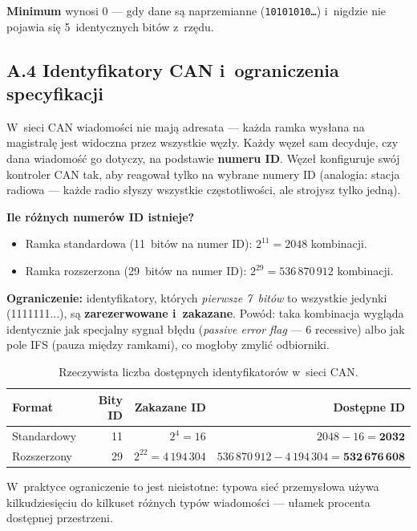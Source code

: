 \documentclass[12pt,a4paper]{article}
\begin{document}
\textbf{Minimum} wynosi 0 — gdy dane są naprzemianne (\texttt{10101010\ldots})
i~nigdzie nie pojawia się 5~identycznych bitów z~rzędu.

\subsection*{A.4 Identyfikatory CAN i~ograniczenia specyfikacji}

W~sieci CAN wiadomości nie mają adresata — każda ramka wysłana na magistralę
jest widoczna przez wszystkie węzły. Każdy węzeł sam decyduje, czy dana
wiadomość go dotyczy, na podstawie \textbf{numeru ID}. Węzeł konfiguruje
swój kontroler CAN tak, aby reagował tylko na wybrane numery ID (analogia:
stacja radiowa — każde radio słyszy wszystkie częstotliwości, ale strojysz
tylko jedną).

\textbf{Ile różnych numerów ID istnieje?}
\begin{itemize}
    \item Ramka standardowa (11~bitów na numer ID): $2^{11} = 2048$ kombinacji.
    \item Ramka rozszerzona (29~bitów na numer ID): $2^{29} = 536\,870\,912$ kombinacji.
\end{itemize}

\textbf{Ograniczenie:} identyfikatory, których \emph{pierwsze 7~bitów} to
wszystkie jedynki (1111111...), są \textbf{zarezerwowane i~zakazane}.
Powód: taka kombinacja wygląda identycznie jak specjalny sygnał błędu
(\textit{passive error flag} — 6 recessive) albo jak pole IFS (pauza między
ramkami), co mogłoby zmylić odbiorniki.

\begin{table}[H]
\centering
\begin{tabular}{lrrr}
\toprule
\textbf{Format} & \textbf{Bity ID} & \textbf{Zakazane ID} & \textbf{Dostępne ID} \\
\midrule
Standardowy & 11 & $2^{4} = 16$ & $2048 - 16 = \mathbf{2032}$ \\
Rozszerzony & 29 & $2^{22} = 4\,194\,304$ & $536\,870\,912 - 4\,194\,304 = \mathbf{532\,676\,608}$ \\
\bottomrule
\end{tabular}
\caption{Rzeczywista liczba dostępnych identyfikatorów w~sieci CAN.}
\end{table}

W~praktyce ograniczenie to jest nieistotne: typowa sieć przemysłowa używa
kilkudziesięciu do kilkuset różnych typów wiadomości — ułamek procenta
dostępnej przestrzeni.
\end{document}
